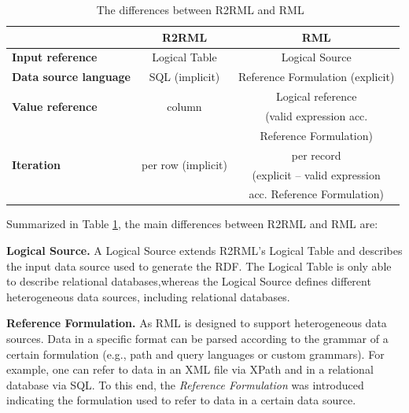 \begin{table}[!t]
\centering
\caption{The differences between R2RML and RML~\citep{dimou2020high}}
\label{tab:soa_rmlvsr2rml}
\begin{tabular}{l|c|c}
                                          & \textbf{R2RML}                      & \textbf{RML}                         \\
\hline                                          
\textbf{Input reference}                  & Logical Table                       & Logical Source                       \\
\hline
\textbf{Data source language}             & SQL (implicit)                      & Reference Formulation (explicit)     \\
\hline
\multirow{2}{*}{\textbf{Value reference}} & \multirow{2}{*}{column}             & Logical reference \\
                                          &                                     & (valid expression acc. \\
                                          &                                     & Reference Formulation) \\
\hline                                          
\multirow{2}{*}{\textbf{Iteration}}       & \multirow{2}{*}{per row (implicit)} & per record        \\
                                          &                                     & (explicit -- valid expression        \\
                                          &                                     & acc. Reference Formulation)
\end{tabular}
\end{table}


\noindent Summarized in Table \ref{tab:soa_rmlvsr2rml}, the main differences between R2RML and RML are:

\noindent\textbf{{Logical Source.}} A Logical Source extends R2RML's Logical Table and describes the input data source used to generate the RDF. The Logical Table is only able to describe relational databases,whereas the Logical Source defines different heterogeneous data sources, including relational databases.

\noindent\textbf{{Reference Formulation.}} As RML is designed to support heterogeneous data sources. Data in a specific format can be parsed according to the grammar of a certain formulation (e.g., path and query languages or custom grammars). For example, one can refer to data in an XML file via XPath and in a relational database via SQL. To this end, the \emph{Reference Formulation} was introduced indicating the formulation used to refer to data in a certain data source.

